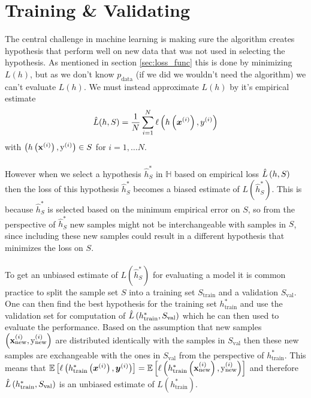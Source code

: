 \section{Training \& Validating}
The central challenge in machine learning is making sure the algorithm creates hypothesis that perform well on new data that was not used in selecting the hypothesis. As mentioned in section \ref{sec:loss_func} this is done by minimizing $L(h)$, but as we don't know $p_\text{data}$ (if we did we wouldn't need the algorithm) we can't evaluate $L(h)$. We must instead approximate $L(h)$ by it's empirical estimate 
\begin{equation*}
    \hat{L}(h,S)= \frac{1}{N} \sum_{i=1}^N \ell \left (h\left (\boldsymbol{x}^{(i)}\right), y^{(i)}\right)
\end{equation*}
with $\left ( h\left (\mathbf{x}^{(i)}\right), \text{y}^{(i)}\right) \in S$ for $i = 1, \dots N$.\\
\\
However when we select a hypothesis $\hat{h}^*_S$ in $\mathbb{H}$ based on empirical loss $\hat{L} \left (h, S\right)$ then the loss of this hypothesis $\hat{h}^*_S$ becomes a biased estimate of $L(\hat{h}^*_S)$. This is because $\hat{h}^*_S$ is selected based on the minimum empirical error on $S$, so from the perspective of $\hat{h}^*_S$ new samples might not be interchangeable with samples in $S$, since including these new samples could result in a different hypothesis that minimizes the loss on $S$. \\
\\
To get an unbiased estimate of $L(\hat{h}^*_S)$ for evaluating a model it is common practice to split the sample set $S$ into a training set $S_\text{train}$ and a validation $S_\text{val}$. One can then find the best hypothesis for the training set $h^*_\text{train}$ and use the validation set for computation of $\hat{L}\left (h^*_\text{train}, S_\text{val}\right)$ which he can then used to evaluate the performance. Based on the assumption that new samples $\left (\mathbf{x}^{(i)}_{\text{new}}, \text{y}^{(i)}_{\text{new}}\right)$ are distributed identically with the samples in $S_\text{val}$ then these new samples are exchangeable with the ones in $S_\text{val}$ from the perspective of $h^*_\text{train}$. This means that $\E \lrs{\ell \lr{h^*_\text{train} \lr{\boldsymbol{x}^{(i)}}, \boldsymbol{y}^{(i)}}} = \E \lrs{\ell \lr{h^*_\text{train} \lr{\mathbf{x}^{(i)}_{\text{new}}}, \text{y}_{\text{new}}^{(i)}}}$ and therefore $\hat{L}\left (h^*_\text{train}, S_\text{val}\right)$ is an unbiased estimate of $L(h^*_\text{train})$.

